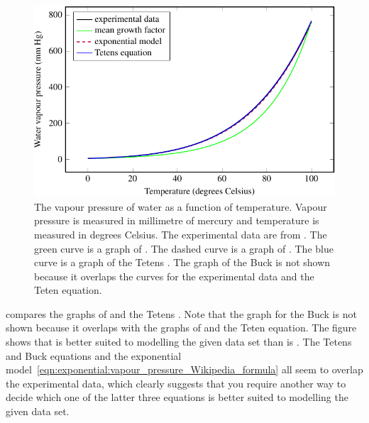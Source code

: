 \documentclass[a4paper,oneside,12pt]{article}
\begin{document}
\begin{problem}
{\begin{solution}
\begin{figure}[!htbp]
\centering
\includegraphics[scale=1.1]{image/11/vapour-pressure.pdf}
\caption{%
  The vapour pressure of water as a function of temperature.  Vapour
  pressure is measured in millimetre of mercury and temperature is
  measured in degrees Celsius.  The experimental data are from
  .  The green curve is a
  graph of .  The
  dashed curve is a graph of
  .  The
  blue curve is a graph of the Tetens
  .  The graph of the
  Buck  is not shown
  because it overlaps the curves for the experimental data and the
  Teten equation.
}
\label{fig:exponential:water_vapour_pressure}
\end{figure}

 compares the graphs of
and the Tetens .
Note that the graph for the Buck
 is not shown because
it overlaps with the graphs of
 and the
Teten equation.  The figure shows that
 is better
suited to modelling the given data set than is
.  The Tetens and
Buck equations and the exponential
model~\eqref{eqn:exponential:vapour_pressure_Wikipedia_formula} all
seem to overlap the experimental data, which clearly suggests that you
require another way to decide which one of the latter three equations
is better suited to modelling the given data set.


\end{solution}}
\end{problem}
\end{document}
